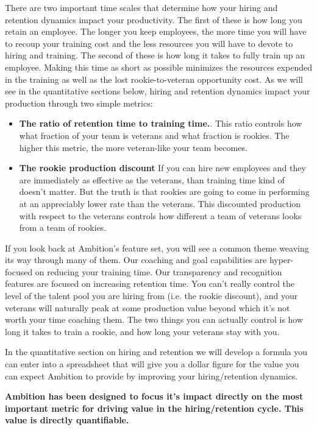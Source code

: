 \documentclass[paper=a4, fontsize=11pt abstract]{scrartcl}
\numberwithin{equation}{section}		%
\numberwithin{figure}{section}			%
\numberwithin{table}{section}				%
\begin{document}
There are two important time scales that determine how your hiring and retention dynamics impact your productivity.  The first of these is how long you retain an employee.  The longer you keep employees, the more time you will have to recoup your training cost and the less resources you will have to devote to hiring and training.  The second of these is how long it takes to fully train up an employee.  Making this time as short as possible minimizes the resources expended in the training as well as the lost rookie-to-veteran opportunity cost.  As we will see in the quantitative sections below, hiring and retention dynamics impact your production through two simple metrics:
\begin{itemize}
    \item \textbf{The ratio of retention time to training time.}. This ratio controls how what fraction of your team is veterans and what fraction is rookies.  The higher this metric, the more veteran-like your team becomes.
    \item \textbf{The rookie production discount} If you can hire new employees and they are immediately as effective as the veterans, than training time kind of doesn't matter.  But the truth is that rookies are going to come in performing at an appreciably lower rate than the veterans.  This discounted production with respect to the veterans controls how different a team of veterans looks from a team of rookies.
\end{itemize}
If you look back at Ambition's feature set, you will see a common theme weaving its way through many of them.  Our coaching and goal capabilities are hyper-focused on reducing your training time. Our transparency and recognition features are focused on increasing retention time.  You can't really control the level of the talent pool you are hiring from (i.e. the rookie discount), and your veterans will naturally peak at some production value beyond which it's not worth your time coaching them.  The two things you can actually control is how long it takes to train a rookie, and how long your veterans stay with you.

In the quantitative section on hiring and retention we will develop a formula you can enter into a spreadsheet that will give you a dollar figure for the value you can expect Ambition to provide by improving your hiring/retention dynamics.

\textbf{Ambition has been designed to focus it's impact directly on the most important metric for driving value in the hiring/retention cycle. This value is directly quantifiable.} 
\end{document}
